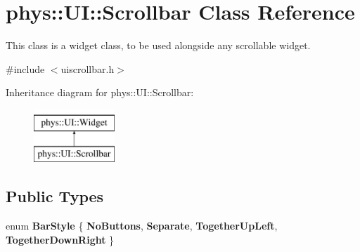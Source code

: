 \hypertarget{classphys_1_1UI_1_1Scrollbar}{
\section{phys::UI::Scrollbar Class Reference}
\label{d0/d3e/classphys_1_1UI_1_1Scrollbar}
}


This class is a widget class, to be used alongside any scrollable widget.  




{\ttfamily \#include $<$uiscrollbar.h$>$}

Inheritance diagram for phys::UI::Scrollbar:\begin{figure}[H]
\begin{center}
\leavevmode
\includegraphics[height=2.000000cm]{d0/d3e/classphys_1_1UI_1_1Scrollbar}
\end{center}
\end{figure}
\subsection*{Public Types}
\begin{DoxyCompactItemize}
\item 
enum {\bfseries BarStyle} \{ {\bfseries NoButtons}, 
{\bfseries Separate}, 
{\bfseries TogetherUpLeft}, 
{\bfseries TogetherDownRight}
 \}
\end{DoxyCompactItemize}
